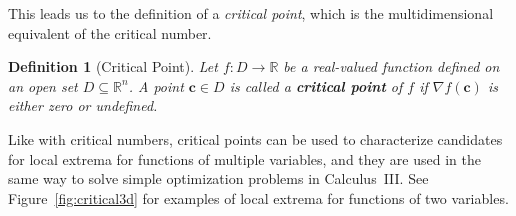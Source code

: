 \documentclass[11pt]{article}
\newtheorem*{definition}{Definition} %
\theoremstyle{definition} %
\begin{document}
This leads us to the definition of a \textit{critical point}, which is the multidimensional equivalent of the critical number.

\begin{definition}[Critical Point]
	Let $f : D \to \mathbb{R}$ be a real-valued function defined on an open set $D \subseteq \mathbb{R}^n$. A point $\mathbf{c} \in D$ is called a \textbf{critical point} of $f$ if $\nabla f(\mathbf{c})$ is either zero or undefined.
\end{definition}

Like with critical numbers, critical points can be used to characterize candidates for local extrema for functions of multiple variables, and they are used in the same way to solve simple optimization problems in Calculus~III. See Figure~\ref{fig:critical3d} for examples of local extrema for functions of two variables.
\end{document}
